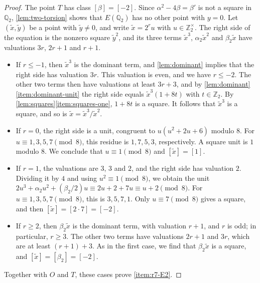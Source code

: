\documentclass[12pt,oneside,openany]{book}
\theoremstyle{definition}
\theoremstyle{plain}
\numberwithin{equation}{chapter}
\theoremstyle{plain}
\theoremstyle{definition}
\theoremstyle{remark}
\newcommand{\Q}{\mathbb Q}
\newcommand{\Z}{\mathbb Z}
\newcommand{\sq}[1]{[#1]}
\begin{document}
\begin{proof}
The point $T$ has class $\sq\beta=\sq{-2}$. Since $\alpha^2-4\beta=\beta'$
is not a square in $\Q_2$, \cref{lem:two-torsion} shows that $E(\Q_2)$ has
no other point with $y=0$. Let $(\tilde x,\tilde y)$ be a point with $\tilde y\ne0$, and write
$\tilde x=2^ru$ with $u\in\Z_2^\times$. The right side of the equation is the
nonzero square $\tilde y^2$, and its three terms $\tilde x^3$, $\alpha_2\tilde x^2$ and
$\beta_2\tilde x$ have valuations $3r$, $2r+1$ and $r+1$.
\begin{itemize}
\item If $r\le-1$, then $\tilde x^3$ is the dominant term, and
\cref{lem:dominant} implies that the right side has valuation $3r$. This
valuation is even, and we have $r\le-2$. The other two terms then have
valuations at least $3r+3$, and by \cref{lem:dominant}\ref{item:dominant-unit}
the right side equals $\tilde x^3(1+8t)$ with $t\in\Z_2$. By
\cref{lem:squares}\ref{item:squares-one}, $1+8t$ is a square. It follows that
$\tilde x^3$ is a square, and so is $\tilde x=\tilde x^3/\tilde x^2$.
\item If $r=0$, the right side is a unit, congruent to $u(u^2+2u+6)$
modulo $8$. For $u\equiv1,3,5,7\pmod8$, this residue is $1,7,5,3$,
respectively. A square unit is $1$ modulo $8$. We conclude that $u\equiv1\pmod8$
and $\sq{\tilde x}=\sq1$.
\item If $r=1$, the valuations are $3$, $3$ and $2$, and the right side has
valuation $2$. Dividing it by $4$ and using $u^2\equiv1\pmod8$, we obtain
the unit $2u^3+\alpha_2u^2+(\beta_2/2)u\equiv2u+2+7u\equiv u+2\pmod8$. For
$u\equiv1,3,5,7\pmod8$, this is $3,5,7,1$. Only $u\equiv7\pmod8$ gives a
square, and then $\sq{\tilde x}=\sq{2\cdot7}=\sq{-2}$.
\item If $r\ge2$, then $\beta_2\tilde x$ is the dominant term, with valuation
$r+1$, and $r$ is odd; in particular, $r\ge3$. The other two terms have
valuations $2r+1$ and $3r$, which are at least $(r+1)+3$. As in the first
case, we find that $\beta_2\tilde x$ is a square, and $\sq{\tilde x}=\sq{\beta_2}=\sq{-2}$.
\end{itemize}
Together with $O$ and $T$, these cases prove \ref{item:r7-E2}.


\end{proof}
\end{document}
